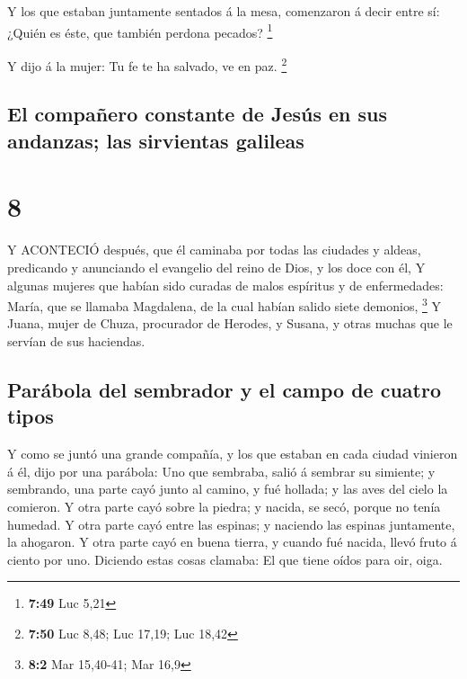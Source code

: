  Y los que estaban juntamente sentados á la mesa,
comenzaron á decir entre sí: ¿Quién es éste, que también perdona
pecados? \footnote{\textbf{7:49} Luc 5,21}

 Y dijo á la mujer: Tu fe te ha salvado, ve en paz.
\footnote{\textbf{7:50} Luc 8,48; Luc 17,19; Luc 18,42}

\hypertarget{el-compauxf1ero-constante-de-jesuxfas-en-sus-andanzas-las-sirvientas-galileas}{%
\subsection{El compañero constante de Jesús en sus andanzas; las
sirvientas
galileas}\label{el-compauxf1ero-constante-de-jesuxfas-en-sus-andanzas-las-sirvientas-galileas}}

\hypertarget{section-7}{%
\section{8}\label{section-7}}

 Y ACONTECIÓ después, que él caminaba por todas las ciudades
y aldeas, predicando y anunciando el evangelio del reino de Dios, y los
doce con él,  Y algunas mujeres que habían sido curadas de
malos espíritus y de enfermedades: María, que se llamaba Magdalena, de
la cual habían salido siete demonios, \footnote{\textbf{8:2} Mar
  15,40-41; Mar 16,9}  Y Juana, mujer de Chuza, procurador
de Herodes, y Susana, y otras muchas que le servían de sus haciendas.

\hypertarget{paruxe1bola-del-sembrador-y-el-campo-de-cuatro-tipos}{%
\subsection{Parábola del sembrador y el campo de cuatro
tipos}\label{paruxe1bola-del-sembrador-y-el-campo-de-cuatro-tipos}}

 Y como se juntó una grande compañía, y los que estaban en
cada ciudad vinieron á él, dijo por una parábola:  Uno que
sembraba, salió á sembrar su simiente; y sembrando, una parte cayó junto
al camino, y fué hollada; y las aves del cielo la comieron. 
Y otra parte cayó sobre la piedra; y nacida, se secó, porque no tenía
humedad.  Y otra parte cayó entre las espinas; y naciendo
las espinas juntamente, la ahogaron.  Y otra parte cayó en
buena tierra, y cuando fué nacida, llevó fruto á ciento por uno.
Diciendo estas cosas clamaba: El que tiene oídos para oir, oiga.

